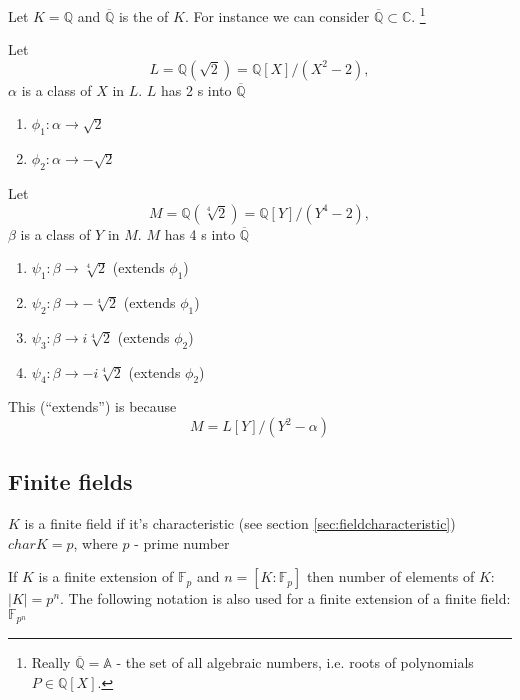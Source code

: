 \begin{example}
  Let $K = \mathbb{Q}$ and $\overline{\mathbb{Q}}$ is the
   of $K$. For instance we can consider
  $\overline{\mathbb{Q}} \subset \mathbb{C}$.
  \footnote{
    Really $\overline{\mathbb{Q}} = \mathbb{A}$ - the set of all algebraic
    numbers, i.e. roots of polynomials $P \in
    \mathbb{Q}\left[X\right]$.
  }

  Let
  \[
  L = \mathbb{Q}\left(\sqrt{2}\right) =
  \mathbb{Q}\left[X\right]/\left(X^2 - 2\right),
  \]
  $\alpha$ is a class of $X$ in $L$. $L$ has 2 s into
  $\overline{\mathbb{Q}}$
  \begin{enumerate}
  \item $\phi_1: \alpha \to \sqrt{2}$
  \item $\phi_2: \alpha \to -\sqrt{2}$
  \end{enumerate}

  Let
  \[
  M = \mathbb{Q}\left(\sqrt[4]{2}\right) =
  \mathbb{Q}\left[Y\right]/\left(Y^4 - 2\right),
  \]
  $\beta$ is a class of $Y$ in $M$. $M$ has 4 s into
  $\overline{\mathbb{Q}}$
  \begin{enumerate}
  \item $\psi_1: \beta \to \sqrt[4]{2}$ (extends $\phi_1$)
  \item $\psi_2: \beta \to -\sqrt[4]{2}$ (extends $\phi_1$)
  \item $\psi_3: \beta \to i\sqrt[4]{2}$ (extends $\phi_2$)
  \item $\psi_4: \beta \to -i\sqrt[4]{2}$ (extends $\phi_2$)
  \end{enumerate}
  This (``extends'') is because
  \[
  M = L\left[Y\right]/\left(Y^2 - \alpha\right) 
  \]
\end{example}

\subsection{Finite fields}

\begin{definition}
  $K$ is a finite field if it's characteristic (see section
  \ref{sec:fieldcharacteristic}) $char K = p$, where $p$ 
  - prime number 
  \label{def:finitefield}
\end{definition}

\begin{remark}[$\mathbb{F}_{p^n}$]
  If $K$ is a finite extension of $\mathbb{F}_p$ and
  $n = \left[K:\mathbb{F}_p\right]$ then number of elements of $K$:
  $\left|K\right| = p^n$. The following notation is also used for a
  finite extension of a finite field: $\mathbb{F}_{p^n}$
  \label{rem:fpn}
\end{remark}

